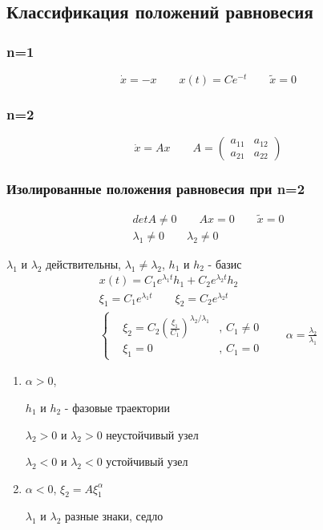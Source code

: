 \documentclass{article}
\begin{document}
\subsection{Классификация положений равновесия}
\subsubsection{n=1}
\[
  \dot{x}=-x \qquad x(t)=Ce^{-t} \qquad \tilde{x}=0
\]

    
\subsubsection{n=2}
\[
  \dot{x}=Ax \qquad
  A=\begin{pmatrix}
    a_{11} & a_{12} \\ 
    a_{21} & a_{22}
  \end{pmatrix}
\]
\subsubsection{Изолированные положения равновесия при n=2}
\begin{gather*}
  det A \neq0 \qquad Ax=0 \qquad \tilde{x}=0 \\ 
  \lambda_1\neq 0 \qquad \lambda_2 \neq 0
\end{gather*}

\hr
$\lambda_1$ и $\lambda_2$ действительны, $\lambda_1 \neq \lambda_2$,
$h_1$ и $h_2$ - базис
\begin{gather*}
  x(t)=C_1 e^{\lambda_1 t} h_1 + C_2 e^{\lambda_2 t} h_2 \\ 
  \xi_1 = C_1 e^{\lambda_1 t} \qquad \xi_2 = C_2 e^{\lambda_2 t} \\ 
  \left\{\begin{aligned}
    & \xi_2 = C_2 \left(\frac{\xi_1}{C_1}\right)^{\lambda_2/\lambda_1} &,\, C_1 \neq0 \\ 
    & \xi_1=0 &,\, C_1 = 0
  \end{aligned}\right. \qquad \alpha = \frac{\lambda_2}{\lambda_1}
\end{gather*}
\begin{enumerate}
  \item $\alpha>0$,

    $h_1$ и $h_2$ - фазовые траектории

    $\lambda_2>0$ и $\lambda_2>0$ неустойчивый узел

    $\lambda_2<0$ и $\lambda_2<0$ устойчивый узел
  \item $\alpha<0$, $\xi_2=A\xi_1^{\alpha}$

    $\lambda_1$ и $\lambda_2$ разные знаки, седло

\end{enumerate}
\end{document}
